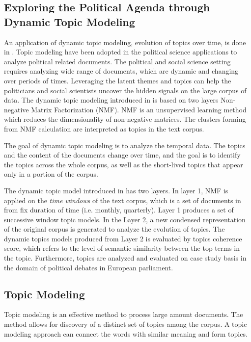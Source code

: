 \subsection{Exploring the Political Agenda through Dynamic Topic Modeling}
An application of dynamic topic modeling, evolution of topics over time, is done in \cite{Greene2016}. Topic modeling have been adopted in the political science applications to analyze political related documents. The political and social science setting requires analyzing wide range of documents, which are dynamic and changing over periods of times. Leveraging the latent themes and topics can help the politicians and social scientists uncover the hidden signals on the large corpus of data. The dynamic topic modeling introduced in \cite{Greene2016} is based on two layers Non-negative Matrix Factorization (NMF). NMF is an unsupervised learning method which reduces the dimensionality of non-negative matrices. The clusters forming from NMF calculation are interpreted as topics in the text corpus. 

The goal of dynamic topic modeling is to analyze the temporal data. The topics and the content of the documents change over time, and the goal is to identify the topics across the whole corpus, as well as the short-lived topics that appear only in a portion of the corpus. 

The dynamic topic model introduced in \cite{Greene2016} has two layers. In layer 1,  NMF is applied on the \textit{time windows} of the text corpus, which is a set of documents in from fix duration of time (i.e. monthly, quarterly).  Layer 1 produces a set of successive window topic models. In the Layer 2, a new condensed representation of the original corpus is generated to analyze the evolution of topics. The dynamic topics models produced from Layer 2 is evaluated by topics coherence score, which refers to the level of semantic similarity between the top terms in the topic. Furthermore, topics are analyzed and evaluated on case study basis in the domain of political debates in European parliament. 





\subsection{Topic Modeling}
Topic modeling is an effective method to process large amount documents. The method allows for discovery of a distinct set of topics among the corpus. A topic modeling approach can connect the words with similar meaning and form topics. 

